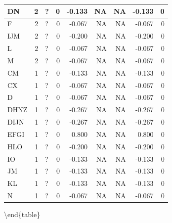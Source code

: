 \documentclass[
  letterpaper,
  DIV=11,
  numbers=noendperiod]{scrreprt}
\begin{document}
\begin{tabular}[t]{l|r|l|r|r|r|r|r|r}
\hspace{1em}DN & 2 & ? & 0 & -0.133 & NA & NA & -0.133 & 0\\
\hline
\hspace{1em}F & 2 & ? & 0 & -0.067 & NA & NA & -0.067 & 0\\
\hline
\hspace{1em}IJM & 2 & ? & 0 & -0.200 & NA & NA & -0.200 & 0\\
\hline
\hspace{1em}L & 2 & ? & 0 & -0.067 & NA & NA & -0.067 & 0\\
\hline
\hspace{1em}M & 2 & ? & 0 & -0.067 & NA & NA & -0.067 & 0\\
\hline
\hspace{1em}CM & 1 & ? & 0 & -0.133 & NA & NA & -0.133 & 0\\
\hline
\hspace{1em}CX & 1 & ? & 0 & -0.067 & NA & NA & -0.067 & 0\\
\hline
\hspace{1em}D & 1 & ? & 0 & -0.067 & NA & NA & -0.067 & 0\\
\hline
\hspace{1em}DHNZ & 1 & ? & 0 & -0.267 & NA & NA & -0.267 & 0\\
\hline
\hspace{1em}DIJN & 1 & ? & 0 & -0.267 & NA & NA & -0.267 & 0\\
\hline
\hspace{1em}EFGI & 1 & ? & 0 & 0.800 & NA & NA & 0.800 & 0\\
\hline
\hspace{1em}HLO & 1 & ? & 0 & -0.200 & NA & NA & -0.200 & 0\\
\hline
\hspace{1em}IO & 1 & ? & 0 & -0.133 & NA & NA & -0.133 & 0\\
\hline
\hspace{1em}JM & 1 & ? & 0 & -0.133 & NA & NA & -0.133 & 0\\
\hline
\hspace{1em}KL & 1 & ? & 0 & -0.133 & NA & NA & -0.133 & 0\\
\hline
\hspace{1em}N & 1 & ? & 0 & -0.067 & NA & NA & -0.067 & 0\\
\hline
\end{tabular}

\textbackslash end\{table\}
\end{document}
